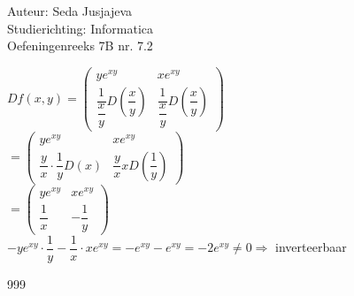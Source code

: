 \documentclass[a4paper]{article}
\begin{document}
\noindent \large Auteur: Seda Jusjajeva\\
\noindent \large Studierichting: Informatica\\
\noindent \large Oefeningenreeks 7B nr. 7.2\\

\medskip

\normalsize


$Df(x, y) = \left(\begin{array}{cc}
    ye^{xy}                                           & xe^{xy} \\
    \dfrac{1}{\dfrac{x}{y}}D\left(\dfrac{x}{y}\right) & \dfrac{1}{\dfrac{x}{y}}D\left(\dfrac{x}{y}\right)
\end{array}\right)$ \\

$= \left(\begin{array}{cc}
    ye^{xy}                           & xe^{xy} \\
    \dfrac{y}{x}\cdot\dfrac{1}{y}D(x) & \dfrac{y}{x}xD\left(\dfrac{1}{y}\right)
\end{array}\right)$ \\

$= \left(\begin{array}{cc}
    ye^{xy}      & xe^{xy} \\
    \dfrac{1}{x} & -\dfrac{1}{y}
\end{array}\right)$ \\

$-ye^{xy}\cdot\dfrac{1}{y} - \dfrac{1}{x}\cdot xe^{xy} = -e^{xy} - e^{xy} = -2e^{xy} \neq 0\Rightarrow $ inverteerbaar \\


\begin{thebibliography}{999}
\end{thebibliography}
\end{document}
